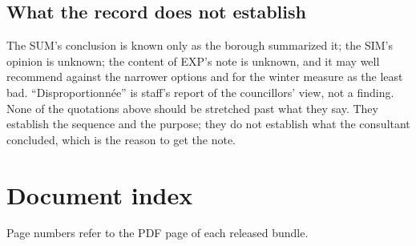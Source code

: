 \documentclass[11pt,letterpaper]{article}
\begin{document}
\subsection{What the record does not establish}

The SUM's conclusion is known only as the borough summarized it; the SIM's
opinion is unknown; the content of EXP's note is unknown, and it may well
recommend against the narrower options and for the winter measure as the
least bad. ``Disproportionn\'ee'' is staff's report of the councillors'
view, not a finding. None of the quotations above should be stretched past
what they say. They establish the sequence and the purpose; they do not
establish what the consultant concluded, which is the reason to get the
note.

\section{Document index}

Page numbers refer to the PDF page of each released bundle.
\end{document}
